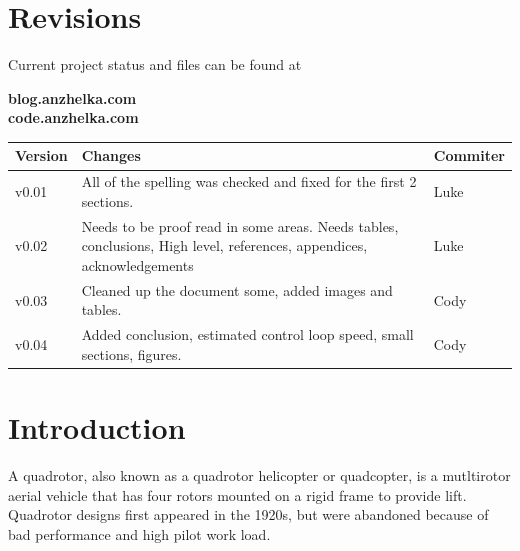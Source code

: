 \documentclass{article}
\numberwithin{equation}{section} %
\begin{document}
\section*{Revisions}
Current project status and files can be found at
\begin{center}
\bigskip \textbf{blog.anzhelka.com} \\
 \textbf{code.anzhelka.com} \\
 \bigskip
\end{center}

\begin{longtable}{l | p{5cm} | l}
\hline
\textbf{Version} & \textbf{Changes} & \textbf{Commiter}\\
\hline
v0.01 & All of the spelling was checked and fixed for the first 2 sections. & Luke \\
\hline
v0.02 & Needs to be proof read in some areas. Needs tables, conclusions, High level, references, appendices, acknowledgements & Luke \\
\hline
v0.03 & Cleaned up the document some, added images and tables. & Cody \\
\hline
v0.04 & Added conclusion, estimated control loop speed, small sections, figures. & Cody \\
\hline
\end{longtable}


\newpage
\renewcommand{\contentsname}{Table of Contents}
\tableofcontents
{}
\newpage



\section{Introduction}

A quadrotor, also known as a quadrotor helicopter or quadcopter, is a mutltirotor aerial vehicle that has four rotors mounted on a rigid frame to provide lift. Quadrotor designs first appeared in the 1920s, but were abandoned because of bad performance and high pilot work load.
\end{document}
